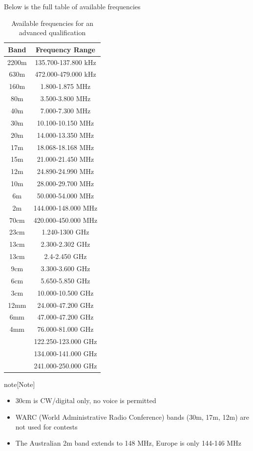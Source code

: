 \documentclass{article}
\begin{document}
Below is the full table of available frequencies

\begin{table}[h]
    \centering
    \caption{Available frequencies for an advanced qualification}
    \label{tab:16}
    \begin{tabular}{c|c}
        Band & Frequency Range \\
        \hline
        \hline
        2200m & 135.700-137.800 kHz \\
        630m & 472.000-479.000 kHz \\
        160m & 1.800-1.875 MHz \\
        80m & 3.500-3.800 MHz \\
        40m & 7.000-7.300 MHz \\
        30m & 10.100-10.150 MHz \\
        20m & 14.000-13.350 MHz \\
        17m & 18.068-18.168 MHz \\
        15m & 21.000-21.450 MHz \\
        12m & 24.890-24.990 MHz \\
        10m & 28.000-29.700 MHz \\
        6m & 50.000-54.000 MHz \\
        2m & 144.000-148.000 MHz \\
        70cm & 420.000-450.000 MHz \\
        23cm & 1.240-1300 GHz \\
        13cm & 2.300-2.302 GHz \\
        13cm & 2.4-2.450 GHz \\
        9cm & 3.300-3.600 GHz \\
        6cm & 5.650-5.850 GHz \\
        3cm & 10.000-10.500 GHz \\
        12mm & 24.000-47.200 GHz \\
        6mm & 47.000-47.200 GHz \\
        4mm & 76.000-81.000 GHz \\
            & 122.250-123.000 GHz \\
            & 134.000-141.000 GHz \\
            & 241.000-250.000 GHz
    \end{tabular}
\end{table}

\begin{callout}{note}[Note]
\begin{itemize}
    \item 30cm is CW/digital only, no voice is permitted
    \item WARC (World Administrative Radio Conference) bands (30m, 17m, 12m) are not used for contests
    \item The Australian 2m band extends to 148 MHz, Europe is only 144-146 MHz
\end{itemize}
\end{callout}
\end{document}
